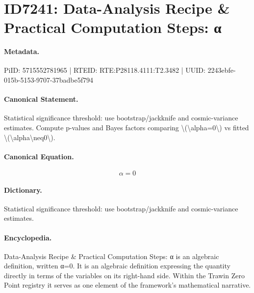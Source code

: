 \section*{ID7241: Data-Analysis Recipe \& Practical Computation Steps: α}
\paragraph{Metadata.}
PiID: 5715552781965 | RTEID: RTE:P28118.4111:T2.3482 | UUID: 2243ebfe-015b-5153-9707-37badbe5f794

\paragraph{Canonical Statement.}
Statistical significance threshold: use bootstrap/jackknife and cosmic-variance estimates. Compute p-values and Bayes factors comparing \textbackslash{}(\textbackslash{}alpha=0\textbackslash{}) vs fitted \textbackslash{}(\textbackslash{}alpha\textbackslash{}neq0\textbackslash{}).

\paragraph{Canonical Equation.}
\[
\alpha=0
\]

\paragraph{Dictionary.}
Statistical significance threshold: use bootstrap/jackknife and cosmic-variance estimates.

\paragraph{Encyclopedia.}
Data-Analysis Recipe \& Practical Computation Steps: α is an algebraic definition, written α=0. It is an algebraic definition expressing the quantity directly in terms of the variables on its right-hand side. Within the Trawin Zero Point registry it serves as one element of the framework's mathematical narrative.
